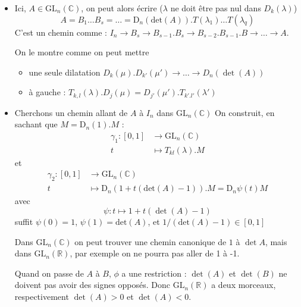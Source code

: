 \begin{myproof}
\begin{itemize}
    \item Ici, $A \in \mathrm{GL} _n(\mathbb{C})$, on peut alors écrire ($\lambda$ ne doit être pas nul dans $D_k(\lambda)$) 
            \[
            A = B_1 \dots B_s = \dots =\mathrm{D} _n(\mathrm{det} (A)).T(\lambda_1)\ldots T(\lambda_q)
          \]
      C'est un chemin comme : $I_n \to B_s \to B _{s-1} .B_s \to B _{s-2}.B _{s-1}. B \to \dots \to A$.

      On le montre comme on peut mettre
      \begin{itemize}

      \item une seule dilatation  $D _{k}(\mu). D _{k'}(\mu') \to \dots \to D_n(\det(A))$
          \item à gauche : $T _{k,l}(\lambda) .D_j( \mu) = D _{j'}( \mu'). T _{k'. l'}( \lambda')$

      \end{itemize}


    
            
    \item Cherchons un chemin allant de $A$ à  $I_n$ dans $\mathrm{GL} _n(\mathbb{C})$
    On construit, en sachant que $M = \mathrm{D}_n(1).M$ :
    \begin{align*}
        \gamma _1 : [0,1] &\to \mathrm{GL} _n(\mathbb{C} ) \\
        t &\mapsto T_{kl}(\lambda).M
    \end{align*}
    et
    \begin{align*}
        \gamma _2 : [0,1] &\to \mathrm{GL} _n(\mathbb{C} ) \\
        t &\mapsto \mathrm{D} _n (1+t(\mathrm{det} (A)-1)).M = \mathrm{D}_n \psi (t) M 
    \end{align*}
    avec $$\psi : t \mapsto 1 + t(\det(A)-1)$$ suffit $\psi(0)=1$,  $\psi(1)= \mathrm{det} (A)$, et $1 / (\mathrm{det} (A)-1) \in [0,1]$

    Dans $\mathrm{GL} _n(\mathbb{C})$ on peut trouver une chemin canonique de $1$ à $\det A$, mais dans  $\mathrm{GL} _n(\mathbb{R} )$, par exemple on ne pourra pas aller de 1 à -1.

    Quand on passe de $A$ à $B$, $\phi$ a une restriction :  $\det(A)$ et $\det(B)$ ne doivent pas avoir des signes opposés. Donc $\mathrm{GL} _n(\mathbb{R} )$ a deux morceaux, respectivement $\det (A) >0$ et  $\det(A)<0$.
\end{itemize}
\end{myproof}

